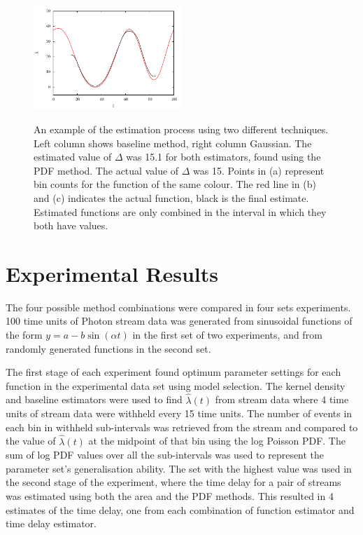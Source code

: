 \documentclass[11pt]{article}
\begin{document}
\begin{figure}[h!]
{   \includegraphics[width=0.5\textwidth]{images/comb_gauss}
   }

   \caption{An example of the estimation process using two different
   techniques. Left column shows baseline method, right column Gaussian. The
   estimated value of $\Delta$ was 15.1 for both estimators, found using the PDF
   method. The actual value of $\Delta$ was 15. Points in (a) represent bin
   counts for the function of the same colour. The red line in (b) and (c)
   indicates the actual function, black is the final estimate. Estimated
   functions are only combined in the interval in which they both have values.}

   \label{fig:finest}
   \end{figure}
\section{Experimental Results}
\label{sec-5}

  The four possible method combinations were compared in four sets
  experiments. 100 time units of Photon stream data was generated from
  sinusoidal functions of the form $y=a-b\sin(\alpha t)$ in the first set of two
  experiments, and from randomly generated functions in the second set.

  The first stage of each experiment found optimum parameter settings for each
  function in the experimental data set using model selection. The kernel
  density and baseline estimators were used to find $\hat{\lambda}(t)$ from
  stream data where 4 time units of stream data were withheld every 15 time
  units. The number of events in each bin in withheld sub-intervals was
  retrieved from the stream and compared to the value of $\hat{\lambda}(t)$ at
  the midpoint of that bin using the log Poisson PDF. The sum of log PDF values
  over all the sub-intervals was used to represent the parameter set's
  generalisation ability. The set with the highest value was used in the second
  stage of the experiment, where the time delay for a pair of streams was
  estimated using both the area and the PDF methods. This resulted in 4
  estimates of the time delay, one from each combination of function estimator
  and time delay estimator.
\end{document}
